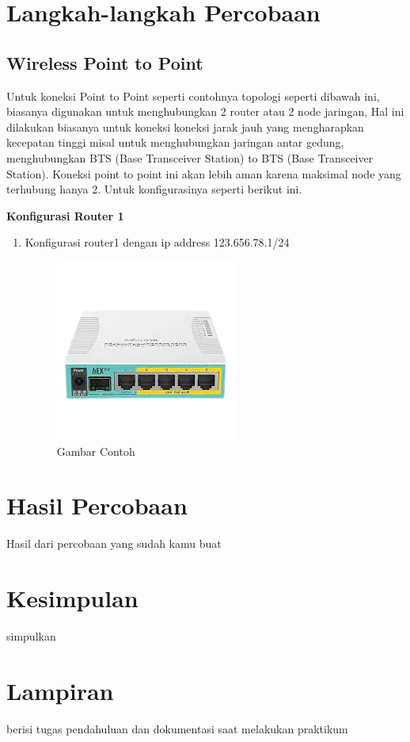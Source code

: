 \section{Langkah-langkah Percobaan}

\subsection{Wireless Point to Point}
Untuk koneksi Point to Point seperti contohnya topologi seperti dibawah ini, biasanya digunakan untuk
menghubungkan 2 router atau 2 node jaringan, Hal ini dilakukan biasanya untuk koneksi koneksi
jarak jauh yang mengharapkan kecepatan tinggi misal untuk menghubungkan jaringan antar gedung,
menghubungkan BTS (Base Transceiver Station) to BTS (Base Transceiver Station). Koneksi point
to point ini akan lebih aman karena maksimal node yang terhubung hanya 2. Untuk konfigurasinya
seperti berikut ini.

\centering \textbf{Konfigurasi Router 1}
\begin{enumerate}
	\item Konfigurasi router1 dengan ip address 123.656.78.1/24
	\begin{figure}[H]
		\centering
		\includegraphics[width=0.5\linewidth]{P1/img/contoh.png}
		\caption{Gambar Contoh}
		\label{fig:gambar1}
	\end{figure}
\end{enumerate}


\section{Hasil Percobaan}
Hasil dari percobaan yang sudah kamu buat

\section{Kesimpulan}
simpulkan

\section{Lampiran}
berisi tugas pendahuluan dan dokumentasi saat melakukan praktikum